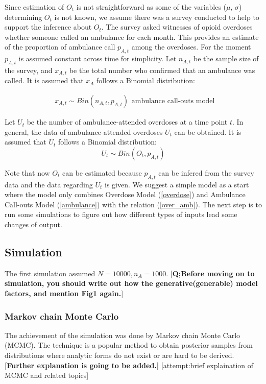 \documentclass[12pt]{article}
\begin{document}
Since estimation of $O_t$ is not straightforward as some of the variables ($\mu$, $\sigma$) determining $O_t$ is not known, we assume there was a survey conducted to help to support the inference about  $O_t$. The survey asked witnesses of opioid overdoses whether someone called an ambulance for each month. This provides an estimate of the proportion of ambulance call $p_{A,t}$ among the overdoses. For the moment $p_{A,t}$ is assumed constant across time for simplicity. Let $n_{A,t}$ be the sample size of the survey, and $x_{A,t}$ be the total number who confirmed that an ambulance was called. It is assumed that $x_{A}$ follows a Binomial distribution:

\begin{equation}
\label{ambulance}
\left.\begin{aligned}
x_{A,t} \sim Bin(n_{A,t},p_{A,t})\end{aligned}\right.
\text{ambulance call-outs model}
\end{equation}

Let \(U_t\) be the number of  ambulance-attended overdoses at a time point $t$. In general, the data of ambulance-attended overdoses \(U_t\) can be obtained. It is assumed that  \(U_t\) follows a Binomial distribution: 
\begin{equation}
\label{over_amb}
\left.
U_t \sim Bin(O_t, p_{A,t})
\right.
\end{equation}

Note that now $O_t$ can be estimated because $p_{A,t}$ can be infered from the survey data and the data regarding $U_t$ is given. We suggest a simple model as a start where the model only combines Overdose Model (\ref{overdose}) and Ambulance Call-outs Model (\ref{ambulance}) with the relation (\ref{over_amb}). The next step is to run some simulations to figure out how different types of inputs lead some changes of output. \\

\subsection{Simulation}

\normalsize 
The first simulation assumed $N= 10000, n_{A}=1000$.  [\textbf{Q;Before moving on to simulation, you should write out how the generative(generable) model factors, and mention Fig1 again.}]\\

\subsubsection{Markov chain Monte Carlo}
The achievement of the simulation was done by Markov chain Monte Carlo (MCMC). The technique is a popular method to obtain posterior samples from distributions where analytic forms do not exist or are hard to be derived. \textbf{[Further explanation is going to be added.]} [attempt:brief explaination of MCMC and related topics]\\
\end{document}
